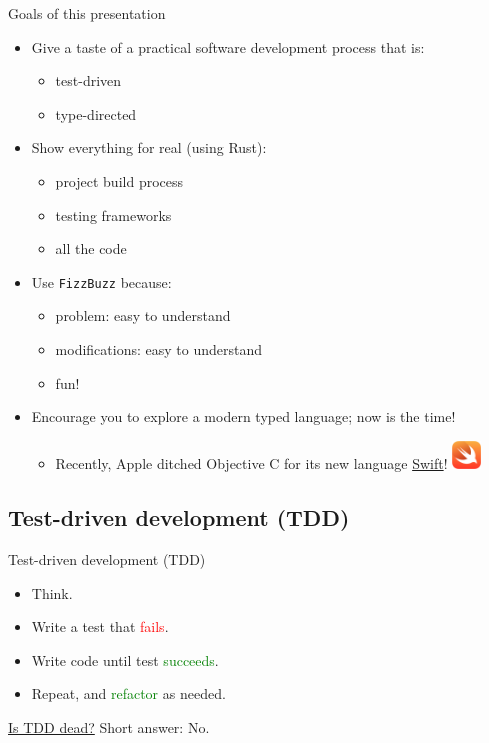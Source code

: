\begin{frame}{Goals of this presentation}
  \begin{itemize}
  \item Give a taste of a \alert{practical} software development \alert{process} that is:
    \begin{itemize}
    \item \alert{test}-driven
    \item \alert{type}-directed
    \end{itemize}
  \item Show everything for real (using Rust):
    \begin{itemize}
    \item project build process
    \item testing frameworks
    \item all the code
    \end{itemize}
  \item Use \texttt{FizzBuzz} because:
    \begin{itemize}
    \item problem: easy to understand
    \item modifications: easy to understand
    \item fun!
    \end{itemize}
  \item Encourage you to explore a modern typed language; now is the time!
    \begin{itemize}
    \item Recently, Apple ditched Objective C for its new language \href{https://developer.apple.com/swift/}{Swift}!
      \includegraphics[height=0.75cm]{swift-hero.png}
    \end{itemize}
  \end{itemize}
\end{frame}

\subsection{Test-driven development (TDD)}

\begin{frame}{Test-driven development (TDD)}
  \begin{itemize}
  \item Think.
  \item Write a test that \textcolor{red}{fails}.
  \item Write code until test \textcolor{green}{succeeds}.
  \item Repeat, and \textcolor{green}{refactor} as needed.
  \end{itemize}

  \begin{block}{\href{http://martinfowler.com/articles/is-tdd-dead/}{Is TDD dead?}}
    Short answer: No.
  \end{block}
\end{frame}

